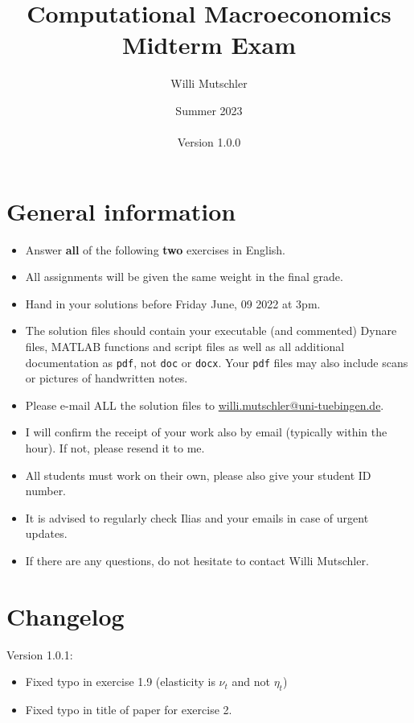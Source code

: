 \documentclass{article}
\begin{document}
	
\title{Computational Macroeconomics\\Midterm Exam}
\author{Willi Mutschler}
\date{Summer 2023\\~\\Version 1.0.0}
\maketitle

\section*{General information}
\begin{itemize}
\item Answer \textbf{all} of the following \textbf{two} exercises in English.
\item All assignments will be given the same weight in the final grade.
\item Hand in your solutions before Friday June, 09 2022 at 3pm.
\item The solution files should contain your executable (and commented) Dynare files, MATLAB functions and script files
  as well as all additional documentation as \texttt{pdf}, not \texttt{doc} or \texttt{docx}.
Your \texttt{pdf} files may also include scans or pictures of handwritten notes.
\item Please e-mail ALL the solution files to \url{willi.mutschler@uni-tuebingen.de}.
\item I will confirm the receipt of your work also by email (typically within the hour). If not, please resend it to me.
\item All students must work on their own, please also give your student ID number.
\item It is advised to regularly check Ilias and your emails in case of urgent updates.
\item If there are any questions, do not hesitate to contact Willi Mutschler.
\end{itemize}

\section*{Changelog}
Version 1.0.1:
\begin{itemize}
	\item Fixed typo in exercise 1.9 (elasticity is $\nu_t$ and not $\eta_t$)
	\item Fixed typo in title of paper for exercise 2.
\end{itemize}
\end{document}
